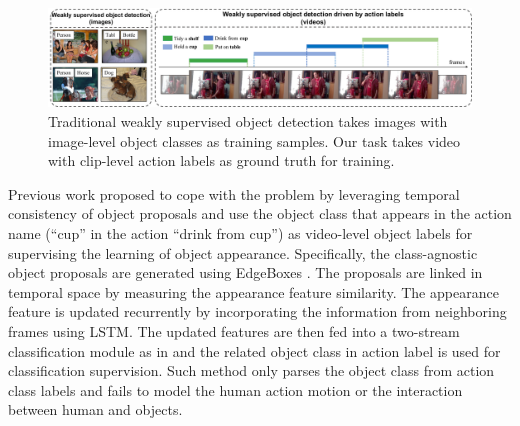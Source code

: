 \begin{figure}
\includegraphics[width=1.0\textwidth]{figures/task_definition.pdf}
\caption{Traditional weakly supervised object detection takes images with image-level object classes as training samples. Our task takes video with clip-level action labels as ground truth for training.}
\label{fig:task_definition}
\end{figure}

Previous work \cite{yuan2017temporal} proposed to cope with the problem by leveraging temporal consistency of object proposals and use the object class that appears in the action name (\eg ``cup'' in the action ``drink from cup'') as video-level object labels for supervising the learning of object appearance. Specifically, the class-agnostic object proposals are generated using EdgeBoxes \cite{zitnick2014edge}. The proposals are linked in temporal space by measuring the appearance feature similarity. The appearance feature is updated recurrently by incorporating the information from neighboring frames using LSTM. The updated features are then fed into a two-stream classification module as in \cite{bilen2016weakly} and the related object class in action label is used for classification supervision. Such method only parses the object class from action class labels and fails to model the human action motion or the interaction between human and objects.

